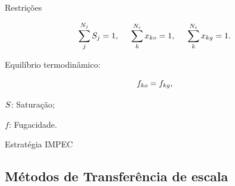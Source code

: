 \documentclass[professionalfont]{beamer}
\begin{document}
\begin{frame}{Restrições}

    \begin{equation}
        \label{eq:modelo_mat.9}
        \sum_{j}^{N_{j}} S_{j} = 1, \hspace{0.5cm} \sum_{k}^{N_{c}} x_{k o} = 1, \hspace{0.5cm} \sum_{k}^{N_{c}} x_{k g} = 1.
    \end{equation}

    Equilíbrio termodinâmico:

    \begin{equation}
        \label{eq:modelo_mat.8}
        f_{k o} = f_{k g},
    \end{equation}

    \begin{description}
        \item $S$: Saturação;
        \item $f$: Fugacidade.
    \end{description}
    
\end{frame}

    


\begin{frame}{Estratégia IMPEC}
    \centering
        \resizebox*{4cm}{!}{
        }
\end{frame}


    

\subsection{Métodos de Transferência de escala}

\end{document}
